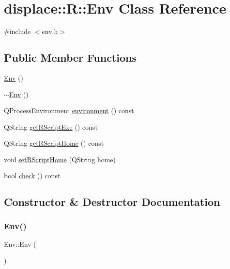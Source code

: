 \hypertarget{classdisplace_1_1_r_1_1_env}{}\section{displace\+::R\+::Env Class Reference}
\label{classdisplace_1_1_r_1_1_env}


{\ttfamily \#include $<$env.\+h$>$}

\subsection*{Public Member Functions}
\begin{DoxyCompactItemize}
\item 
\mbox{\hyperlink{classdisplace_1_1_r_1_1_env_a60054c2be7d109a6d1b740af6896198b}{Env}} ()
\item 
\mbox{\hyperlink{classdisplace_1_1_r_1_1_env_aa2296b62ae91d666089f12c324568df9}{$\sim$\+Env}} ()
\item 
Q\+Process\+Environment \mbox{\hyperlink{classdisplace_1_1_r_1_1_env_a806e21dca0e8a294a31a15a0a3419c09}{environment}} () const
\item 
Q\+String \mbox{\hyperlink{classdisplace_1_1_r_1_1_env_aaddbae16ae7b4a83b98fdd3158722bf4}{get\+R\+Script\+Exe}} () const
\item 
Q\+String \mbox{\hyperlink{classdisplace_1_1_r_1_1_env_a5981af5bec4df8c225b9af2e397950c2}{get\+R\+Script\+Home}} () const
\item 
void \mbox{\hyperlink{classdisplace_1_1_r_1_1_env_ab73ed820003148ee312fb1d8302d339d}{set\+R\+Script\+Home}} (Q\+String home)
\item 
bool \mbox{\hyperlink{classdisplace_1_1_r_1_1_env_a4ee53ec9af0c9f98a5f52eb8de92d709}{check}} () const
\end{DoxyCompactItemize}


\subsection{Constructor \& Destructor Documentation}
\mbox{\label{classdisplace_1_1_r_1_1_env_a60054c2be7d109a6d1b740af6896198b}} 
\subsubsection{\texorpdfstring{Env()}{Env()}}
{\footnotesize\ttfamily Env\+::\+Env (\begin{DoxyParamCaption}{ }\end{DoxyParamCaption})}

